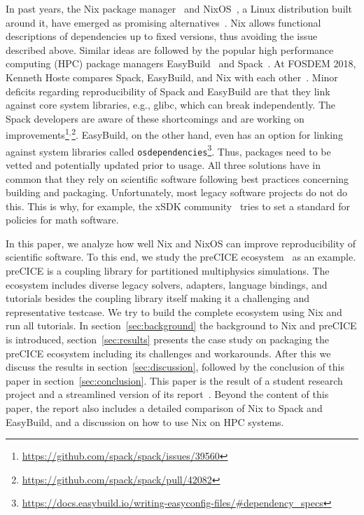 \documentclass{eceasst}
\begin{document}
In past years, the Nix package manager~\cite{Dolstra_2004} and NixOS~\cite{Dolstra_2010}, a Linux distribution built around it, have emerged as promising alternatives~\cite{Devresse_2015}.
Nix allows functional descriptions of dependencies up to fixed versions, thus avoiding the issue described above.
Similar ideas are followed by the popular high performance computing (HPC) package managers EasyBuild~\cite{easybuil6495863} and Spack~\cite{spack7832814}.
At FOSDEM 2018, Kenneth Hoste compares Spack, EasyBuild, and Nix with each other~\cite{Hoste}.
Minor deficits regarding reproducibility of Spack and EasyBuild are that they link against core system libraries, e.g., glibc, which can break independently. The Spack developers are aware of these shortcomings and are working on improvements\footnote{\url{https://github.com/spack/spack/issues/39560}}$^,$\footnote{\url{https://github.com/spack/spack/pull/42082}}.
EasyBuild, on the other hand, even has an option for linking against system libraries called \texttt{osdependencies}\footnote{\url{https://docs.easybuild.io/writing-easyconfig-files/\#dependency\_specs}}. Thus, packages need to be vetted and potentially updated prior to usage.
All three solutions have in common that they rely on scientific software following best practices concerning building and packaging.
Unfortunately, most legacy software projects do not do this.
This is why, for example, the xSDK community~\cite{xSDK2023} tries to set a standard for policies for math software.

In this paper, we analyze how well Nix and NixOS can improve reproducibility of scientific software.
To this end, we study the preCICE ecosystem~\cite{preCICEv2} as an example.
preCICE is a coupling library for partitioned multiphysics simulations.
The ecosystem includes diverse legacy solvers, adapters, language bindings, and tutorials besides the coupling library itself making it a challenging and representative testcase.
We try to build the complete ecosystem using Nix and run all tutorials.
In section~\ref{sec:background} the background to Nix and preCICE is introduced, section~\ref{sec:results} presents the case study on packaging the preCICE ecosystem including its challenges and workarounds.
After this we discuss the results in section~\ref{sec:discussion}, followed by the conclusion of this paper in section~\ref{sec:conclusion}.
This paper is the result of a student research project and a streamlined version of its report~\cite{studentreport}.
Beyond the content of this paper, the report also includes a detailed comparison of Nix to Spack and EasyBuild, and a discussion on how to use Nix on HPC systems.
\end{document}
